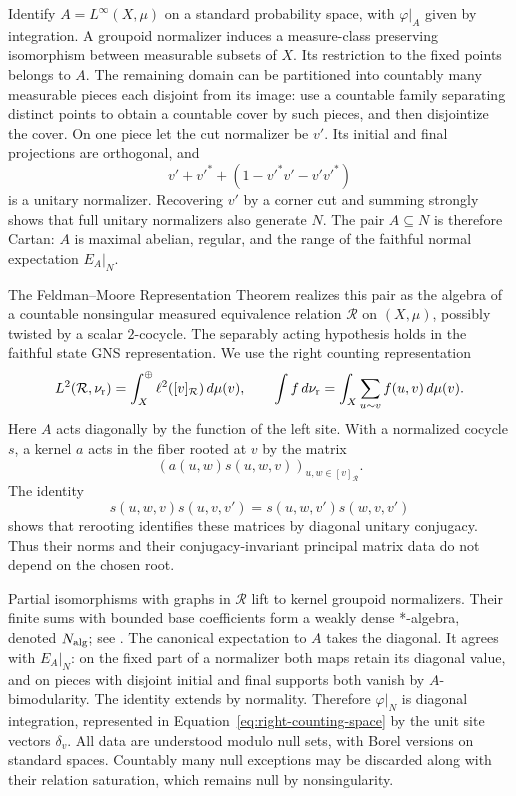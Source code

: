 Identify $A=L^\infty(X,\mu)$ on a standard probability space, with
$\varphi|_A$ given by integration.  A groupoid normalizer induces a
measure-class preserving isomorphism between measurable subsets of
$X$.  Its restriction to the fixed points belongs to $A$.  The remaining
domain can be partitioned into countably many measurable pieces each
disjoint from its image: use a countable family separating distinct
points to obtain a countable cover by such pieces, and then disjointize
the cover.  On one piece let the cut normalizer be $v'$.  Its initial
and final projections are orthogonal, and
\[
 v'+{v'}^*+(1-{v'}^*v'-v'{v'}^*)
\]
is a unitary normalizer.  Recovering $v'$ by a corner cut and summing
strongly shows that full unitary normalizers also generate $N$.
The pair $A\subseteq N$ is therefore Cartan: $A$ is maximal abelian,
regular, and the range of the faithful normal expectation $E_A|_N$.

The Feldman--Moore Representation Theorem
\cite[Theorem~1]{FM77} realizes this pair as the algebra of a countable
nonsingular measured equivalence relation $\mathcal R$ on $(X,\mu)$,
possibly twisted by a scalar $2$-cocycle.  The separably acting
hypothesis holds in the faithful state GNS representation.  We use the
right counting representation
\begin{equation}\label{eq:right-counting-space}
 L^2(\mathcal R,\nu_{\rm r})
 =\int_X^\oplus \ell^2([v]_{\mathcal R})\,d\mu(v),
 \qquad
 \int f\,d\nu_{\rm r}
 =\int_X\sum_{u\sim v}f(u,v)\,d\mu(v).
\end{equation}
Here $A$ acts diagonally by the function of the left site.  With a
normalized cocycle $s$, a kernel $a$ acts in the fiber rooted at $v$ by
the matrix
\[
 (a(u,w)s(u,w,v))_{u,w\in[v]_{\mathcal R}}.
\]
The identity
\[
 s(u,w,v)s(u,v,v')
 =s(u,w,v')s(w,v,v')
\]
shows that rerooting identifies these matrices by diagonal unitary
conjugacy.  Thus their norms and their conjugacy-invariant principal
matrix data do not depend on the chosen root.

Partial isomorphisms with graphs in $\mathcal R$ lift to kernel
groupoid normalizers.  Their finite sums with bounded base
coefficients form a weakly dense *-algebra, denoted $N_{\rm alg}$;
see \cite[Section~2]{FM77}.  The canonical expectation to $A$ takes the
diagonal.  It agrees with $E_A|_N$: on the fixed part of a normalizer
both maps retain its diagonal value, and on pieces with disjoint
initial and final supports both vanish by $A$-bimodularity.  The
identity extends by normality.  Therefore $\varphi|_N$ is diagonal
integration, represented in Equation~\eqref{eq:right-counting-space}
by the unit site vectors $\delta_v$.
All data are understood modulo null sets, with Borel versions on
standard spaces.  Countably many null exceptions may be discarded
along with their relation saturation, which remains null by
nonsingularity.

